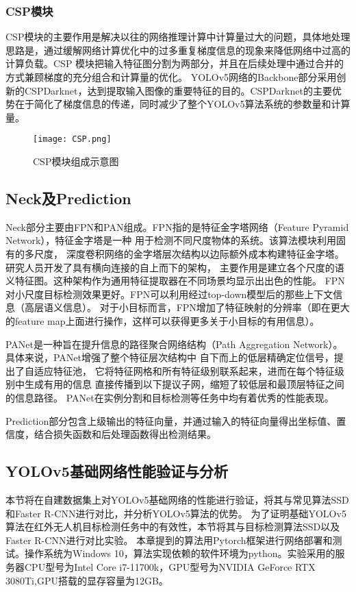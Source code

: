 \subsubsection{CSP模块}
CSP模块的主要作用是解决以往的网络推理计算中计算量过大的问题，具体地处理思路是，通过缓解网络计算优化中的过多重复梯度信息的现象来降低网络中过高的计算负载。CSP 模块把输入特征图分割为两部分，并且在后续处理中通过合并的方式兼顾梯度的充分组合和计算量的优化。
YOLOv5网络的Backbone部分采用创新的CSPDarknet，达到提取输入图像的重要特征的目的。CSPDarknet的主要优势在于简化了梯度信息的传递，同时减少了整个YOLOv5算法系统的参数量和计算量。

\begin{figure}[h]
  \centering
  \texttt{[image: CSP.png]}
  \caption{CSP模块组成示意图}
  \label{csp}
\end{figure}

\subsection{Neck及Prediction}
Neck部分主要由FPN和PAN组成。FPN指的是特征金字塔网络（Feature Pyramid Network），特征金字塔是一种
用于检测不同尺度物体的系统。该算法模块利用固有的多尺度，
深度卷积网络的金字塔层次结构以边际额外成本构建特征金字塔。研究人员开发了具有横向连接的自上而下的架构，
主要作用是建立各个尺度的语义特征图。这种架构作为通用特征提取器在不同场景均显示出出色的性能。
FPN对小尺度目标检测效果更好。FPN可以利用经过top-down模型后的那些上下文信息（高层语义信息）。
对于小目标而言，FPN增加了特征映射的分辨率（即在更大的feature map上面进行操作，这样可以获得更多关于小目标的有用信息）。

PANet是一种旨在提升信息的路径聚合网络结构（Path Aggregation Network）。
具体来说，PANet增强了整个特征层次结构中
自下而上的低层精确定位信号，提出了自适应特征池，
它将特征网格和所有特征级别联系起来，进而在每个特征级别中生成有用的信息
直接传播到以下提议子网，缩短了较低层和最顶层特征之间的信息路径。
PANet在实例分割和目标检测等任务中均有着优秀的性能表现。

Prediction部分包含上级输出的特征向量，并通过输入的特征向量得出坐标值、置信度，结合损失函数和后处理函数得出检测结果。

\subsection{YOLOv5基础网络性能验证与分析}
本节将在自建数据集上对YOLOv5基础网络的性能进行验证，将其与常见算法SSD和Faster R-CNN进行对比，并分析YOLOv5算法的优势。
为了证明基础YOLOv5算法在红外无人机目标检测任务中的有效性，本节将其与目标检测算法SSD以及Faster R-CNN进行对比实验。
本章提到的算法用Pytorch框架进行网络部署和测试。操作系统为Windows 10，算法实现依赖的软件环境为python。实验采用的服务器CPU型号为Intel Core i7-11700k，GPU型号为NVIDIA GeForce RTX 3080Ti,GPU搭载的显存容量为12GB。



